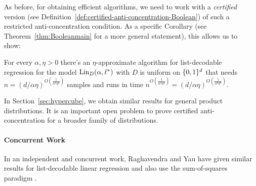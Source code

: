 As before, for obtaining efficient algorithms, we need to work with a \emph{certified} version (see Definition~\ref{def:certified-anti-concentration-Boolean}) of such a restricted anti-concentration condition. As a specific Corollary (see Theorem~\ref{thm:Booleanmain} for a more general statement), this allows us to show:
\begin{theorem} \label{thm:boolcube}
For every $\alpha, \eta > 0$ there's an $\eta$-approximate algorithm for list-decodable regression for the model $\mathrm{Lin}_D(\alpha,\ell^*)$ with $D$ is uniform on $\{0,1\}^d$ that needs $n = (d/\alpha \eta)^{O(\frac{1}{\alpha^4 \eta^4})}$  samples and runs in time $n^{O(\frac{1}{\alpha^4 \eta^4})} = (d/\alpha \eta)^{O(\frac{1}{\alpha^8 \eta^8})}$.
\end{theorem} 

In Section~\ref{sec:hypercube}, we obtain similar results for general product distributions. It is an important open problem to prove certified anti-concentration for a broader family of distributions. %


\paragraph{Concurrent Work}
In an independent and concurrent work, Raghavendra and Yau have given similar results for list-decodable linear regression and also use the sum-of-squares paradigm \cite{RY19}.

